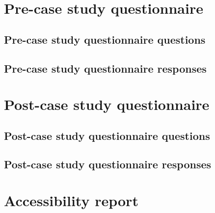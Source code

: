 \documentclass{master_thesis}
\begin{document}
\appendix
{}
\section{Pre-case study questionnaire }\label{appendix:pre-survey}
\subsection{Pre-case study questionnaire questions}\label{appendix:pre-survey-questions}
\subsection{Pre-case study questionnaire responses}\label{appendix:pre-survey-responses}
\section{Post-case study questionnaire }\label{appendix:post-survey}
\subsection{Post-case study questionnaire questions}\label{appendix:post-survey-questions}
\subsection{Post-case study questionnaire responses}\label{appendix:post-survey-responses}
\section{Accessibility report}\label{appendix:report}

\end{document}
